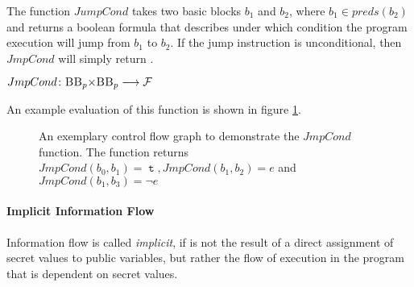 \begin{definition} The function $JumpCond$ takes two basic blocks $b_1$ and $b_2$, where $b_1 \in preds(b_2)$ and returns a boolean formula that describes under which condition the program execution will jump from $b_1$ to $b_2$. If the jump instruction is unconditional, then $JmpCond$ will simply return \ttt.
    \begin{center}
        $JmpCond\colon \mbb_p \times \mbb_p \longrightarrow \mbform$
    \end{center}
\end{definition}
An example evaluation of this function is shown in figure \ref{fig:jmp_cond}.

\begin{figure}[H]
    \label{fig:jmp_cond}
    \centering
    \caption{An exemplary control flow graph to demonstrate the $JmpCond$ function. The function returns $JmpCond(b_0, b_1) = \mttt, JmpCond(b_1, b_2) = e$ and $JmpCond(b_1, b_3) = \neg e$}
\end{figure}

\paragraph{Implicit Information Flow}
Information flow is called \emph{implicit}, if is not the result of a direct assignment of secret values to public variables, but rather the flow of execution in the program that is dependent on secret values.

